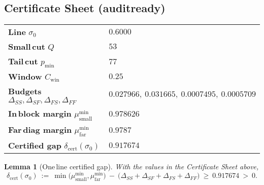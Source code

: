 \documentclass[11pt]{article}
\newtheorem{lemma}[theorem]{Lemma}
\theoremstyle{definition}
\theoremstyle{remark}
\begin{document}
\subsection*{Certificate Sheet (audit\textendash ready)}\label{subsec:certificate-sheet}
\newcommand{\sigmaZero}{0.6000}
\newcommand{\QZero}{53}
\newcommand{\pminZero}{77}
\newcommand{\CwinVal}{0.25}
\newcommand{\DeltaSSZero}{0.027966}
\newcommand{\DeltaSFZero}{0.031665}
\newcommand{\DeltaFSZero}{0.0007495}
\newcommand{\DeltaFFZero}{0.0005709}
\newcommand{\muSmallMinZero}{0.978626}
\newcommand{\muFarMinZero}{0.9787}
\newcommand{\deltaCertZero}{0.917674}
\noindent\begin{tabular}{ll}
\textbf{Line} $\sigma_0$ & $\sigmaZero$ \\
\textbf{Small\,cut} $Q$ & $\QZero$ \\
\textbf{Tail\,cut} $p_{\min}$ & $\pminZero$ \\
\textbf{Window} $C_{\mathrm{win}}$ & $\CwinVal$ \\
\textbf{Budgets} $\Delta_{SS},\Delta_{SF},\Delta_{FS},\Delta_{FF}$ & $\DeltaSSZero,\ \DeltaSFZero,\ \DeltaFSZero,\ \DeltaFFZero$ \\
\textbf{In\,block margin} $\mu^{\min}_{\mathrm{small}}$ & $\muSmallMinZero$ \\
\textbf{Far\,diag margin} $\mu^{\min}_{\mathrm{far}}$ & $\muFarMinZero$ \\
\textbf{Certified gap} $\delta_{\mathrm{cert}}(\sigma_0)$ & $\deltaCertZero$ \\
\end{tabular}

\medskip
\begin{lemma}[One\,line certified gap]\label{lem:sheet-gap}
With the values in the Certificate Sheet above,
\[
  \delta_{\mathrm{cert}}(\sigma_0)\ :=\ \min\big(\mu^{\min}_{\mathrm{small}},\mu^{\min}_{\mathrm{far}}\big)
    \ -\ \big(\Delta_{SS}+\Delta_{SF}+\Delta_{FS}+\Delta_{FF}\big)
  \ \ge\ \deltaCertZero\ >\ 0.
\]
\end{lemma}
\end{document}
